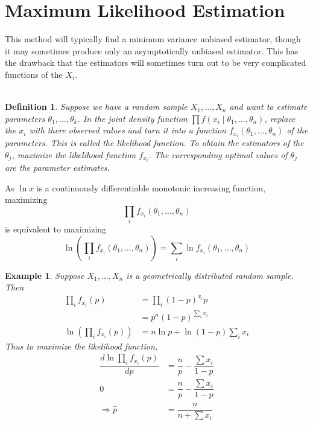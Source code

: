 \documentclass[1pt]{report}
\newtheorem{defn}[thm]{Definition}
\newtheorem{eg}[thm]{Example}
\newcommand{\<}{\langle}
\renewcommand{\>}{\rangle}
\begin{document}
\section{Maximum Likelihood Estimation}\label{sec:maximumlikelihood}
This method will typically find a minimum variance unbiased estimator, though it may sometimes produce only an asymptotically unbiased estimator. This has the drawback that the estimators will sometimes turn out to be very complicated functions of the $X_i$. \\
\\
\begin{defn}\label{def:likelihood}
Suppose we have a random sample $X_1, \dots , X_n$ and want to estimate parameters $\theta_1, \dots , \theta_k$. In the joint density function $\prod f(x_i \mid \theta_1, \dots, \theta_n)$, replace the $x_i$ with there observed values and turn it into a function $f_{x_i}(\theta_1,\dots, \theta_n)$ of the parameters. This is called the \emph{likelihood function}. To obtain the estimators of the $\theta_j$, maximize the likelihood function $f_{x_i}$. The corresponding optimal values of $\theta_j$ are the parameter estimates.
\end{defn}
As $\ln x$ is a continuously differentiable monotonic increasing function, maximizing
$$\prod\limits_i f_{x_i}(\theta_1, \dots, \theta_n)$$
is equivalent to maximizing
$$\ln\left(\prod\limits_i f_{x_i}(\theta_1, \dots, \theta_n) \right) = \sum\limits_i \ln f_{x_i}(\theta_1, \dots, \theta_n)$$
\begin{eg}
Suppose $X_1, \dots , X_n$ is a geometrically distributed random sample. Then 
\begin{align*}
\prod\limits_i f_{x_i}(p) & = \prod\limits_i (1-p)^{x_i} p\\
&= p^n (1-p)^{\sum\limits_i x_i}\\
\ln\left(\prod\limits_i f_{x_i}(p)\right) &= n \ln p + \ln(1-p)\sum\limits_i x_i
\end{align*}
Thus to maximize the likelihood function,
\begin{align*}
\dfrac{d\ln \prod\limits_i f_{x_i}(p)}{dp} & = \dfrac{n}{p} - \dfrac{\sum x_i}{1-p} \\
0 &= \dfrac{n}{p} - \dfrac{\sum x_i}{1-p}\\
\Rightarrow \hat p & = \dfrac{n}{n + \sum x_i}
\end{align*}
\end{eg}
\end{document}
